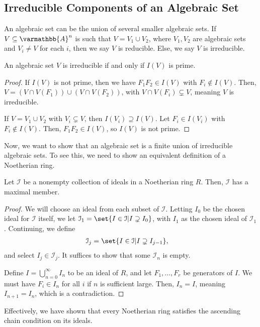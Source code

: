 \documentclass[10pt]{mypackage}
\renewcommand*{\mathbb}[1]{\varmathbb{#1}}
\newcommand{\A}{\mathbb{A}}
\begin{document}
\subsection{Irreducible Components of an Algebraic Set}%
An algebraic set can be the union of several smaller algebraic sets. If $V\subseteq \A^n$ is such that $V = V_1 \cup V_2$, where $V_1,V_2$ are algebraic sets and $V_i\neq V$ for each $i$, then we say $V$ is reducible. Else, we say $V$ is irreducible.
\begin{proposition}
  An algebraic set $V$ is irreducible if and only if $I(V)$ is prime.
\end{proposition}
\begin{proof}
  If $I(V)$ is not prime, then we have $F_1F_2\in I(V)$ with $F_i\notin I(V)$. Then, $V = \left( V\cap V\left(F_1\right) \right)\cup\left( V\cap V\left(F_2\right) \right)$, with $V\cap V\left( F_i \right)\subsetneq V$, meaning $V$ is irreducible.\newline

  If $V = V_1\cup V_2$ with $V_i\subsetneq V$, then $I\left( V_i \right)\supseteq I(V)$. Let $F_i\in I\left( V_i \right)$ with $F_i\notin I(V)$. Then, $F_1F_2\in I(V)$, so $I(V)$ is not prime.
\end{proof}
Now, we want to show that an algebraic set is a finite union of irreducible algebraic sets. To see this, we need to show an equivalent definition of a Noetherian ring.
\begin{lemma}
  Let $\mathcal{I}$ be a nonempty collection of ideals in a Noetherian ring $R$. Then, $\mathcal{I}$ has a maximal member.
\end{lemma}
\begin{proof}
  We will choose an ideal from each subset of $\mathcal{I}$. Letting $I_0$ be the chosen ideal for $\mathcal{I}$ itself, we let $\mathcal{I}_1 = \set{I\in \mathcal{I} | I\supsetneq I_0}$, with $I_1$ as the chosen ideal of $\mathcal{I}_1$. Continuing, we define
  \begin{align*}
    \mathcal{I}_j &= \set{I\in \mathcal{I} | I\supsetneq I_{j-1}},
  \end{align*}
  and select $I_j\in \mathcal{I}_j$. It suffices to show that some $\mathcal{I}_n$ is empty.\newline

  Define $I = \bigcup_{n=0}^{\infty}I_n$ to be an ideal of $R$, and let $F_1,\dots,F_r$ be generators of $I$. We must have $F_i\in I_n$ for all $i$ if $n$ is sufficient large. Then, $I_n = I$, meaning $I_{n+1} = I_{n}$, which is a contradiction.
\end{proof}
Effectively, we have shown that every Noetherian ring satisfies the ascending chain condition on its ideals.\newline
\end{document}
